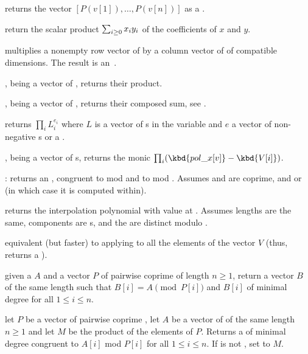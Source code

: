  returns the vector
$[P(v[1]),\ldots,P(v[n])]$ as a .

 return the scalar product
$\sum_{i\geq 0} x_i\*y_i$ of the coefficients of $x$ and $y$.

 multiplies a nonempty row
vector of  by a column vector of  of compatible dimensions.
The result is an~.

,  being a vector of ,
returns their product.

,  being a vector of ,
returns their composed sum, see .

 returns
$\prod_i L_i^{e_i}$ where $L$ is a vector of s in the variable 
and $e$ a vector of non-negative s or a .

,  being a vector
of s, returns the monic 
$\prod_i (\kbd{pol\_x[v]} - \kbd{V[i]})$.

:
returns an , congruent to  mod  and to  mod
. Assumes  and  are coprime, and 
or  (in which case it is computed within).

 returns the 
interpolation polynomial with value  at . Assumes lengths
are the same, components are s, and the  are distinct
modulo .

 equivalent (but
faster) to applying  to all the elements of the
vector $V$ (thus, returns a ).

given a  $A$ and a vector $P$ of pairwise coprime  of length
$n\ge 1$, return a vector $B$ of the same length such that $B[i] =
A\pmod{P[i]}$ and $B[i]$ of minimal degree for all $1\leq i\leq n$.

let $P$ be a vector of pairwise coprime , let $A$ be a vector of
 of the same length $n\ge 1$ and let $M$ be the product of the
elements of $P$. Returns a  of minimal degree congruent to $A[i]$ mod
$P[i]$ for all $1\leq i\leq n$.
If  is not , set  to $M$.

